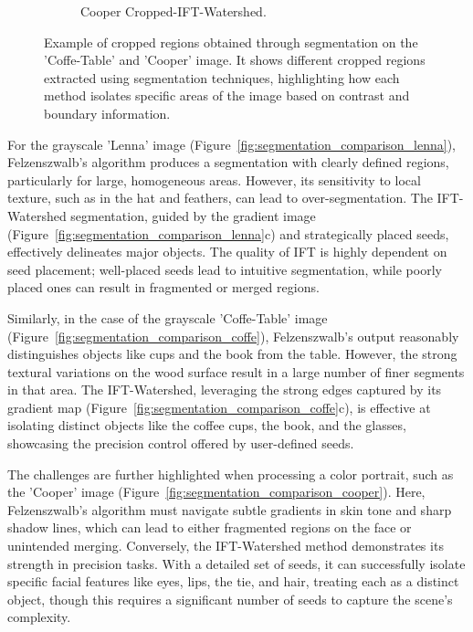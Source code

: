\documentclass{sbc2023}
\begin{document}
\begin{figure}[H]
\begin{subfigure}[b]{0.14\textwidth}
            \caption{Cooper Cropped-IFT-Watershed.}
            \label{fig:cooper_cropped_ift}
        \end{subfigure}
    \caption{Example of cropped regions obtained through segmentation on the 'Coffe-Table' and 'Cooper' image. It shows different cropped regions extracted using segmentation techniques, highlighting how each method isolates specific areas of the image based on contrast and boundary information.}
    \label{fig:cropped_segments}
    \end{figure}

For the grayscale 'Lenna' image (Figure~\ref{fig:segmentation_comparison_lenna}), Felzenszwalb's algorithm produces a segmentation with clearly defined regions, particularly for large, homogeneous areas. However, its sensitivity to local texture, such as in the hat and feathers, can lead to over-segmentation. The IFT-Watershed segmentation, guided by the gradient image (Figure~\ref{fig:segmentation_comparison_lenna}c) and strategically placed seeds, effectively delineates major objects. The quality of IFT is highly dependent on seed placement; well-placed seeds lead to intuitive segmentation, while poorly placed ones can result in fragmented or merged regions.

Similarly, in the case of the grayscale 'Coffe-Table' image (Figure~\ref{fig:segmentation_comparison_coffe}), Felzenszwalb's output reasonably distinguishes objects like cups and the book from the table. However, the strong textural variations on the wood surface result in a large number of finer segments in that area. The IFT-Watershed, leveraging the strong edges captured by its gradient map (Figure~\ref{fig:segmentation_comparison_coffe}c), is effective at isolating distinct objects like the coffee cups, the book, and the glasses, showcasing the precision control offered by user-defined seeds.

The challenges are further highlighted when processing a color portrait, such as the 'Cooper' image (Figure~\ref{fig:segmentation_comparison_cooper}). Here, Felzenszwalb's algorithm must navigate subtle gradients in skin tone and sharp shadow lines, which can lead to either fragmented regions on the face or unintended merging. Conversely, the IFT-Watershed method demonstrates its strength in precision tasks. With a detailed set of seeds, it can successfully isolate specific facial features like eyes, lips, the tie, and hair, treating each as a distinct object, though this requires a significant number of seeds to capture the scene's complexity.
\end{document}
